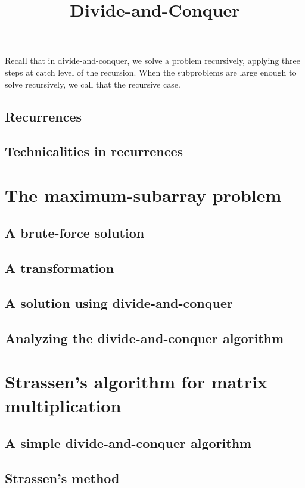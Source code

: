 \documentclass[a4paper,12pt]{article}
\begin{document}
\title{Divide-and-Conquer}

  Recall that in divide-and-conquer, we solve a problem recursively, applying three steps at
  catch level of the recursion. When the subproblems are large enough to solve recursively,
  we call that the recursive case.
 
  \subsection{Recurrences}
  
  \subsection{Technicalities in recurrences}
  
  \section{The maximum-subarray problem}
  
    \subsection{A brute-force solution}
    
    \subsection{A transformation}
    
    \subsection{A solution using divide-and-conquer}
    
    \subsection{Analyzing the divide-and-conquer algorithm}
    
  \section{Strassen's algorithm for matrix multiplication}
  
    \subsection{A simple divide-and-conquer algorithm}
    
    \subsection{Strassen's method}
    
\end{document}
